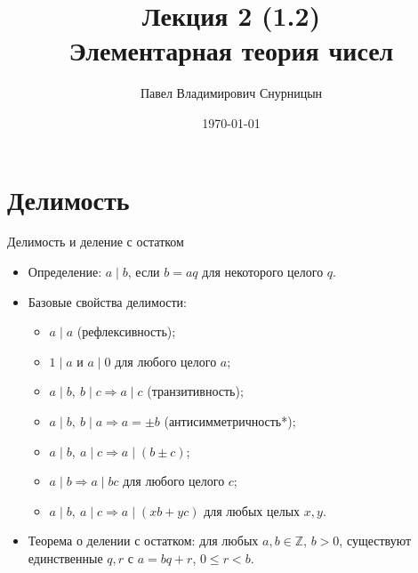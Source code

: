 \documentclass[serif, aspectratio=169]{beamer}
\author{Павел Владимирович Снурницын}
\title{Лекция 2 (1.2)\\ Элементарная теория чисел}
\institute{к.ф.-м.н., с.н.с., ИБ ВМК}
\date{\small \today}
\begin{document}
\begin{frame}
    \titlepage
\end{frame}
\note{}

\section{Делимость}

\begin{frame}{Делимость и деление с остатком}
    \begin{itemize}
        \item Определение: $a \mid b$, если $b = aq$ для некоторого целого $q$.
        \item Базовые свойства делимости:
        \begin{itemize}
            \item $a\mid a$ (рефлексивность);
            \item $1\mid a$ и $a\mid 0$ для любого целого $a$;
            \item $a\mid b,\ b\mid c \Rightarrow a\mid c$ (транзитивность);
            \item $a\mid b,\ b\mid a \Rightarrow a =\pm b$ (антисимметричность*);
            \item $a\mid b,\ a\mid c \Rightarrow a \mid (b\pm c)$;
            \item $a\mid b \Rightarrow a\mid bc$ для любого целого $c$;
            \item $a\mid b,\ a\mid c \Rightarrow a \mid (xb+yc)$ для любых целых $x,y$.
        \end{itemize}
        \item Теорема о делении с остатком: для любых $a, b\in\mathbb{Z}$, $b>0$, существуют единственные $q, r$ с $a = bq + r$, $0 \le r < b$.
    \end{itemize}
\end{frame}
\end{document}
